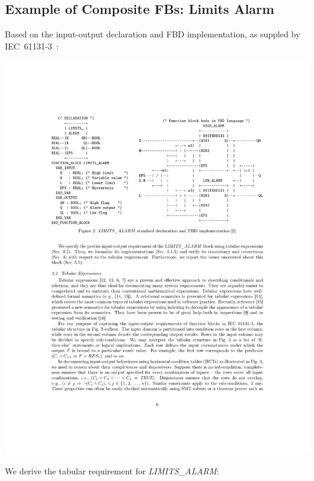 \documentclass[a0,landscape]{a0poster}
\def\graphspacing{\vspace{.5cm}}
\newcommand{\capcolor}[1]{{\color{Black} #1}}
\newcommand{\var}[1]{{\small \textit{#1}}}
\begin{document}
\begin{multicols}{4}
{\color{Blue} \subsection*{Example of Composite FBs: Limits Alarm}}

\noindent Based on the input-output declaration and FBD implementation, as suppled by IEC~61131-3~\cite{IEC:2003:IEP}:

\begin{center}\graphspacing
\includegraphics[width=\linewidth]{figures/limits_alarm/limits_alarm_decl}
\end{center}\graphspacing

\noindent We derive the tabular requirement for \var{LIMITS\_ALARM}:


\end{multicols}
\end{document}
